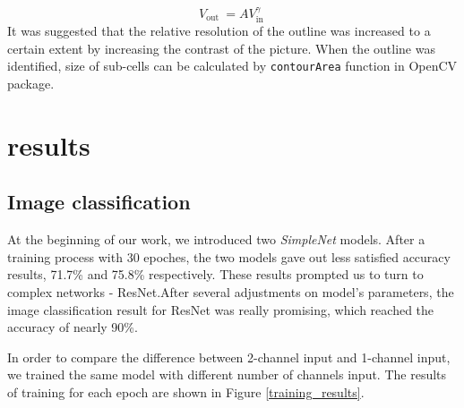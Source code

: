 \documentclass[12pt]{article}
\begin{document}
$$
V_{\text {out }}=A V_{\text {in }}^{\gamma}
$$
It was suggested that the relative resolution of the outline was increased to a certain extent by increasing the contrast of the picture. When the outline was identified, size of sub-cells can be calculated by \lstinline|contourArea| function in OpenCV package.
\section*{results}
\subsection*{Image classification}
\par At the beginning of our work, we introduced two \textit{SimpleNet} models. After a training process with 30 epoches, the two models gave out less satisfied accuracy results, 71.7\% and 75.8\% respectively. These results prompted us to turn to complex networks - ResNet.After several adjustments on model's parameters, the image classification result for ResNet was really promising, which reached the accuracy of nearly 90\%. 
\par In order to compare the difference between 2-channel input and 1-channel input, we trained the same model with different number of channels input. The results of training for each epoch are shown in Figure \ref{training_results}.
\end{document}

